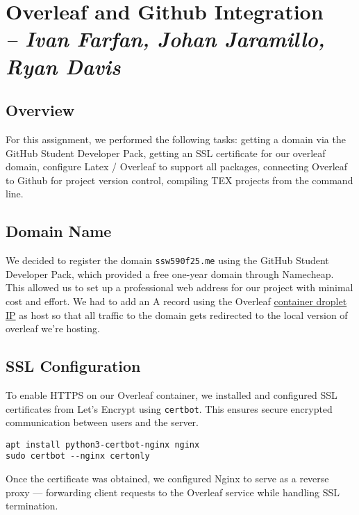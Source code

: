 \chapter{Overleaf and Github Integration \\
\small{\textit{-- Ivan Farfan, Johan Jaramillo, Ryan Davis}}}
\label{Chapter::Overleaf and Github Integration}

\section{Overview}
For this assignment, we performed the following tasks: getting a domain via the GitHub Student Developer Pack, getting an SSL certificate for our overleaf domain, configure Latex / Overleaf to support all packages, connecting Overleaf to Github for project version control, compiling TEX projects from the command line.

\section{Domain Name}
We decided to register the domain \texttt{ssw590f25.me} using the GitHub Student Developer Pack, which provided a free one-year domain through Namecheap. This allowed us to set up a professional web address for our project with minimal cost and effort. We had to add an A record using the Overleaf \hyperref[Chapter::Hosts]{container droplet IP} as host so that all traffic to the domain gets redirected to the local version of overleaf we're hosting.

\section{SSL Configuration}

To enable HTTPS on our Overleaf container, we installed and configured SSL certificates from Let’s Encrypt using \texttt{certbot}. This ensures secure encrypted communication between users and the server.

\begin{verbatim}
apt install python3-certbot-nginx nginx
sudo certbot --nginx certonly
\end{verbatim}

Once the certificate was obtained, we configured Nginx to serve as a reverse proxy — forwarding client requests to the Overleaf service while handling SSL termination.

